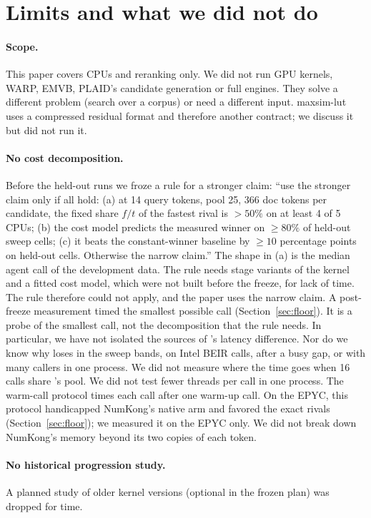 \section{Limits and what we did not do}
\label{sec:limits}

\paragraph{Scope.}
This paper covers CPUs and reranking only.
We did not run GPU kernels, WARP, EMVB, PLAID's candidate generation or full engines.
They solve a different problem (search over a corpus) or need a different input.
maxsim-lut uses a compressed residual format and therefore another contract; we discuss it but did not run it.

\paragraph{No cost decomposition.}
Before the held-out runs we froze a rule for a stronger claim: ``use the stronger claim only if all hold: (a) at 14 query tokens, pool 25, 366 doc tokens per candidate, the fixed share $f/t$ of the fastest rival is $> 50\%$ on at least 4 of 5 CPUs; (b) the cost model predicts the measured winner on $\geq 80\%$ of held-out sweep cells; (c) it beats the constant-winner baseline by $\geq 10$ percentage points on held-out cells. Otherwise the narrow claim.''
The shape in (a) is the median agent call of the development data.
The rule needs stage variants of the kernel and a fitted cost model, which were not built before the freeze, for lack of time.
The rule therefore could not apply, and the paper uses the narrow claim.
A post-freeze measurement timed the smallest possible call (Section~\ref{sec:floor}).
It is a probe of the smallest call, not the decomposition that the rule needs.
In particular, we have not isolated the sources of \sweet's latency difference.
Nor do we know why \sweet loses in the sweep bands, on Intel BEIR calls, after a busy gap, or with many callers in one process.
We did not measure where the time goes when 16 calls share \sweet's pool.
We did not test fewer threads per call in one process.
The warm-call protocol times each call after one warm-up call. On the EPYC, this protocol handicapped NumKong's native arm and favored the exact rivals (Section~\ref{sec:floor}); we measured it on the EPYC only.
We did not break down NumKong's memory beyond its two copies of each token.

\paragraph{No historical progression study.}
A planned study of older kernel versions (optional in the frozen plan) was dropped for time.

